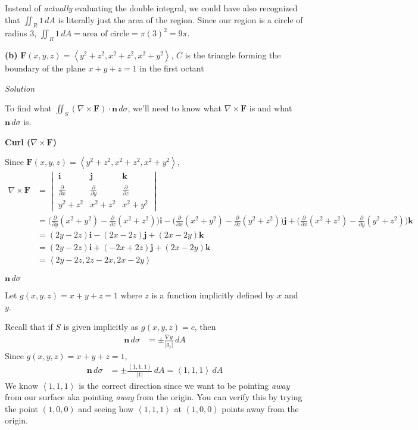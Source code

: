 \documentclass{article}
\newcommand{\lrp}[1]{\left( #1 \right)}
\newcommand{\lra}[1]{\left\langle #1 \right\rangle}
\renewcommand{\i}[0]{\mathbf{i}}
\renewcommand{\j}[0]{\mathbf{j}}
\renewcommand{\k}[0]{\mathbf{k}}
\newcommand{\F}[0]{\mathbf{F}}
\newcommand{\n}[0]{\mathbf{n}}
\newcommand{\Solution}{\textit{Solution}}
\begin{document}
Instead of \textit{actually} evaluating the double integral, we could have also recognized that $\displaystyle \iint_R 1\,dA$ is literally just the area of the region. Since our region is a circle of radius $3$, $\displaystyle \iint_R 1\,dA=\text{area of circle}=\pi(3)^2=9\pi$.

{}\textbf{(b)} $\F(x,y,z)=\lra{y^2+z^2,x^2+z^2,x^2+y^2}$, $C$ is the triangle forming the boundary of the plane $x+y+z=1$ in the first octant

\Solution

To find what $\displaystyle\iint_S \lrp{\nabla \times \F}\cdot \n\,d\sigma$, we'll need to know what $\nabla \times \F$ is and what $\n\,d\sigma$ is.

{} \textbf{Curl ($\displaystyle\nabla \times \F$)}

Since $\F(x,y,z)=\lra{y^2+z^2,x^2+z^2,x^2+y^2}$,
\begin{align*}
    \nabla \times \F &= \begin{vmatrix}
    \i & \j & \k \\
    \frac{\partial }{\partial x} &  \frac{\partial }{\partial y} &
     \frac{\partial }{\partial z}\\
    y^2+z^2& x^2+z^2 & x^2+y^2
    \end{vmatrix}\\
    &=\Bigg(\frac{\partial }{\partial y}(x^2+y^2)-\frac{\partial }{\partial z}(x^2+z^2)\Bigg)\i-\Bigg(\frac{\partial}{\partial x}(x^2+y^2)-\frac{\partial}{\partial z}(y^2+z^2)\Bigg)\j+\Bigg(\frac{\partial}{\partial x}(x^2+z^2)-\frac{\partial}{\partial y}({y^2+z^2})\Bigg)\k\\
    &=\lrp{2y-2z}\i-\lrp{2x-2z}\j+\lrp{2x-2y}\k\\
    &=\lrp{2y-2z}\i+\lrp{-2x+2z}\j+\lrp{2x-2y}\k\\
    &=\lra{2y-2z,2z-2x,2x-2y}
\end{align*}

{} \textbf{$\n\,d\sigma$}

Let $g(x,y,z)=x+y+z=1$ where $z$ is a function implicitly defined by $x$ and $y$. 

Recall that if $S$ is given implicitly as $g(x,y,z)=c$, then
\begin{align*}
    \n\,d\sigma &= \pm\frac{\nabla g}{\left|g_z\right|}\,dA
\end{align*}
Since $g(x,y,z)=x+y+z=1$,
\begin{align*}
    \n \,d\sigma &=\pm\frac{\lra{1,1,1}}{\left|1\right|}\,dA=\lra{1,1,1}\,dA
\end{align*}
We know $\lra{1,1,1}$ is the correct direction since we want to be pointing \textit{away} from our surface aka pointing \textit{away} from the origin. You can verify this by trying the point $(1,0,0)$ and seeing how $\lra{1,1,1}$ at $(1,0,0)$ points away from the origin.
\end{document}
